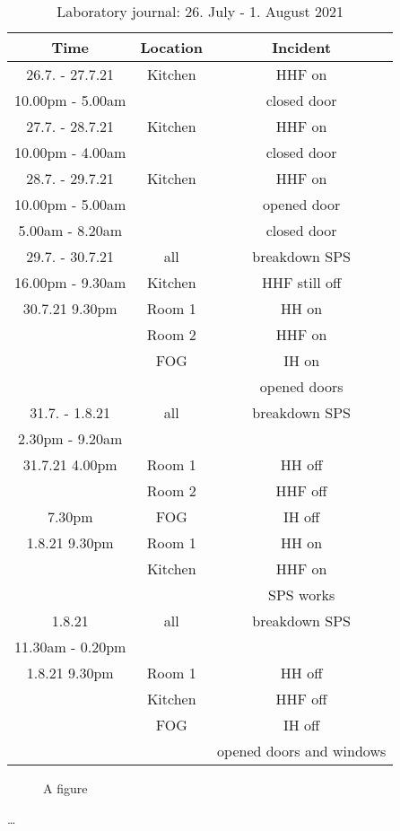 \begin{table}[H]
    \centering
    \begin{tabular}{c|c|c}
        \textbf{Time} & \textbf{Location} & \textbf{Incident }\\
        \hline
        \hline
        26.7. - 27.7.21 & Kitchen & HHF on\\
        10.00pm - 5.00am & & closed door\\
        \hline
        27.7. - 28.7.21 & Kitchen & HHF on\\
        10.00pm - 4.00am & & closed door\\
        \hline
        28.7. - 29.7.21 & Kitchen & HHF on\\
        10.00pm - 5.00am & & opened door\\
        5.00am - 8.20am & & closed door\\
        \hline
        29.7. - 30.7.21 & all & breakdown SPS\\
        16.00pm - 9.30am & Kitchen & HHF still off\\
        \hline
        30.7.21 9.30pm & Room 1 & HH on\\
        & Room 2 & HHF on\\
        & FOG & IH on\\
        && opened doors\\
        \hline
        31.7. - 1.8.21 & all & breakdown SPS\\
        2.30pm - 9.20am &&\\
        \hline
        31.7.21 4.00pm & Room 1 & HH off\\
        & Room 2 & HHF off\\
        7.30pm & FOG & IH off\\
        \hline
        1.8.21 9.30pm & Room 1 & HH on\\
        & Kitchen & HHF on\\
       && SPS works\\
       \hline
        1.8.21 & all & breakdown SPS\\
        11.30am - 0.20pm &&\\
        \hline
        1.8.21 9.30pm & Room 1 & HH off\\
        & Kitchen & HHF off\\
        & FOG & IH off\\
        && opened doors and windows\\
    \end{tabular}
    \caption{Laboratory journal: 26. July - 1. August 2021}
    \label{tab:Experiment2app}
\end{table}

\setcounter{figure}{0}
		
\begin{figure} [ht]
  \centering
  \caption{A figure}
  \label{fig:anotherfigure}
\end{figure}


\dots